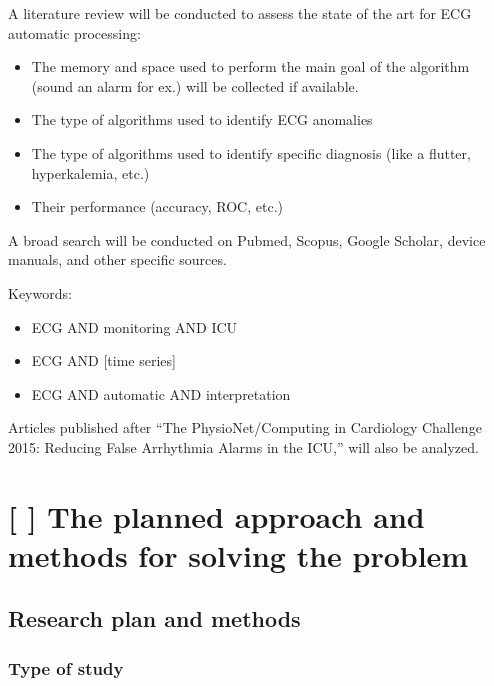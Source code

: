 \documentclass[runningheads]{llncs}
\providecommand{\tightlist}{%
  \setlength{\itemsep}{0pt}\setlength{\parskip}{0pt}}
\begin{document}
A literature review will be conducted to assess the state of the art for
ECG automatic processing:

\begin{itemize}
\tightlist
\item
  The memory and space used to perform the main goal of the algorithm
  (sound an alarm for ex.) will be collected if available.
\item
  The type of algorithms used to identify ECG anomalies
\item
  The type of algorithms used to identify specific diagnosis (like a
  flutter, hyperkalemia, etc.)
\item
  Their performance (accuracy, ROC, etc.)
\end{itemize}

A broad search will be conducted on Pubmed, Scopus, Google Scholar,
device manuals, and other specific sources.

Keywords:

\begin{itemize}
\tightlist
\item
  ECG AND monitoring AND ICU
\item
  ECG AND {[}time series{]}
\item
  ECG AND automatic AND interpretation
\end{itemize}

Articles published after ``The PhysioNet/Computing in Cardiology
Challenge 2015: Reducing False Arrhythmia Alarms in the ICU,'' will also
be analyzed.

\hypertarget{the-planned-approach-and-methods-for-solving-the-problem}{%
\section{{[} {]} The planned approach and methods for solving the
problem}\label{the-planned-approach-and-methods-for-solving-the-problem}}

\hypertarget{research-plan-and-methods}{%
\subsection{Research plan and methods}\label{research-plan-and-methods}}

\hypertarget{type-of-study}{%
\subsubsection{Type of study}\label{type-of-study}}
\end{document}
